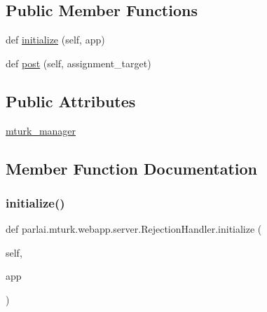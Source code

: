 \subsection*{Public Member Functions}
\begin{DoxyCompactItemize}
\item 
def \hyperlink{classparlai_1_1mturk_1_1webapp_1_1server_1_1RejectionHandler_af55902f1aecca9cde35328c8356525ce}{initialize} (self, app)
\item 
def \hyperlink{classparlai_1_1mturk_1_1webapp_1_1server_1_1RejectionHandler_ab53a292bed562b166bd63ef81ae38a43}{post} (self, assignment\+\_\+target)
\end{DoxyCompactItemize}
\subsection*{Public Attributes}
\begin{DoxyCompactItemize}
\item 
\hyperlink{classparlai_1_1mturk_1_1webapp_1_1server_1_1RejectionHandler_add298625ab3b54fd34cc774e7eeb9e7c}{mturk\+\_\+manager}
\end{DoxyCompactItemize}


\subsection{Member Function Documentation}
\mbox{\label{classparlai_1_1mturk_1_1webapp_1_1server_1_1RejectionHandler_af55902f1aecca9cde35328c8356525ce}} 
\subsubsection{\texorpdfstring{initialize()}{initialize()}}
{\footnotesize\ttfamily def parlai.\+mturk.\+webapp.\+server.\+Rejection\+Handler.\+initialize (\begin{DoxyParamCaption}\item[{}]{self,  }\item[{}]{app }\end{DoxyParamCaption})}

\mbox{\label{classparlai_1_1mturk_1_1webapp_1_1server_1_1RejectionHandler_ab53a292bed562b166bd63ef81ae38a43}} 
